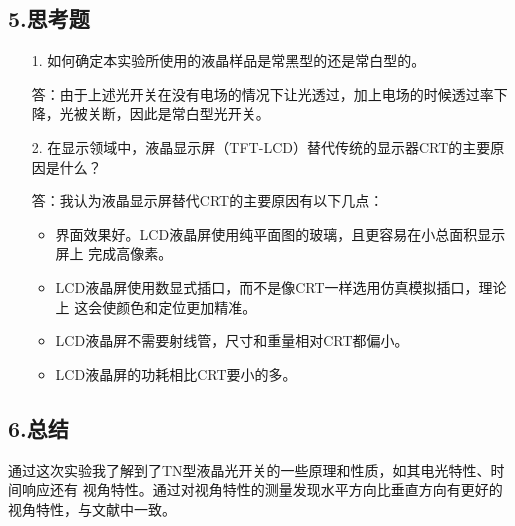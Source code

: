 \documentclass[utf8]{ctexart}
\begin{document}
	\subsection*{5.思考题}
	\begin{itemize}
		\item [1.] 如何确定本实验所使用的液晶样品是常黑型的还是常白型的。
  		\item []答：由于上述光开关在没有电场的情况下让光透过，加上电场的时候透过率下降，光被关断，因此是常白型光开关。
		\item [2.] 在显示领域中，液晶显示屏（TFT-LCD）替代传统的显示器CRT的主要原因是什么？
  		\item []答：我认为液晶显示屏替代CRT的主要原因有以下几点：
		\begin{itemize}
			\item 界面效果好。LCD液晶屏使用纯平面图的玻璃，且更容易在小总面积显示屏上
			完成高像素。
			\item LCD液晶屏使用数显式插口，而不是像CRT一样选用仿真模拟插口，理论上
			这会使颜色和定位更加精准。
			\item LCD液晶屏不需要射线管，尺寸和重量相对CRT都偏小。
			\item LCD液晶屏的功耗相比CRT要小的多。
		\end{itemize}
	\end{itemize}


	\subsection*{6.总结}
	通过这次实验我了解到了TN型液晶光开关的一些原理和性质，如其电光特性、时间响应还有
	视角特性。通过对视角特性的测量发现水平方向比垂直方向有更好的视角特性，与文献\cite{art1}中一致。

	
	
	
	\label{unknown}
\end{document}
